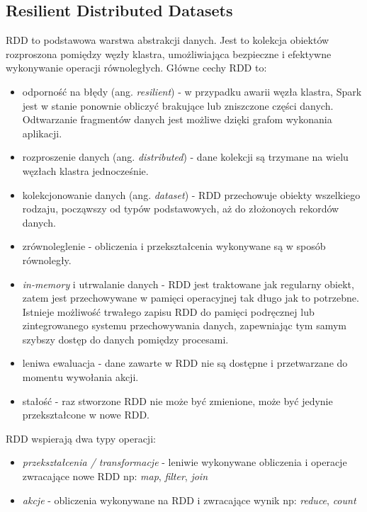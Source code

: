 \documentclass{pracamgr}
\begin{document}
\subsection{Resilient Distributed Datasets}
RDD to podstawowa warstwa abstrakcji danych. Jest to kolekcja obiektów rozproszona pomiędzy węzły klastra, umożliwiająca bezpieczne i efektywne wykonywanie operacji równoległych. Główne cechy RDD to:
\begin{itemize}
    \item odporność na błędy (ang. \textit{resilient}) - w przypadku awarii węzła klastra, Spark jest w stanie ponownie obliczyć brakujące lub zniszczone części danych. Odtwarzanie fragmentów danych jest możliwe dzięki grafom wykonania aplikacji.
    \item rozproszenie danych (ang. \textit{distributed}) - dane kolekcji są trzymane na wielu węzłach klastra jednocześnie.
    \item kolekcjonowanie danych (ang. \textit{dataset}) - RDD przechowuje obiekty wszelkiego rodzaju, począwszy od typów podstawowych, aż do złożonoych rekordów danych.
    \item zrównoleglenie - obliczenia i przekształcenia wykonywane są w sposób równoległy.
    \item \textit{in-memory} i utrwalanie danych - RDD jest traktowane jak regularny obiekt, zatem jest przechowywane w pamięci operacyjnej tak długo jak to potrzebne. Istnieje możliwość trwałego zapisu RDD do pamięci podręcznej lub zintegrowanego systemu przechowywania danych, zapewniając tym samym szybszy dostęp do danych pomiędzy procesami.
    \item leniwa ewaluacja - dane zawarte w RDD nie są dostępne i przetwarzane do momentu wywołania akcji.
    \item stałość - raz stworzone RDD nie może być zmienione, może być jedynie przekształcone w nowe RDD.
    
\end{itemize}

RDD wspierają dwa typy operacji:
\begin{itemize}
    \item \textit{przekształcenia / transformacje} - leniwie wykonywane obliczenia i operacje zwracające nowe RDD np: \textit{map}, \textit{filter}, \textit{join}
    \item \textit{akcje} - obliczenia wykonywane na RDD i zwracające wynik np: \textit{reduce}, \textit{count}
\end{itemize}
\end{document}
